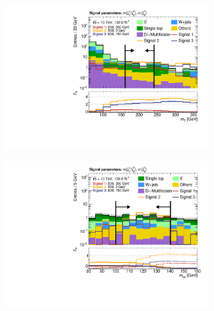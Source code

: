 \begin{figure}
\begin{subfigure}[b]{0.4\linewidth}
		\centering\includegraphics[width=\textwidth]{n1_SRMM_mct_bins/mt_both.pdf}
		\caption{\label{fig:Wh_reopt_second_round_n1_srmm_mt}}
	\end{subfigure}%
	\begin{subfigure}[b]{0.4\linewidth}
		\centering\includegraphics[width=\textwidth]{n1_SRMM_mct_bins/mbb_both.pdf}
		\caption{\label{fig:Wh_reopt_second_round_n1_srmm_mbb}}
	\end{subfigure}
	\begin{subfigure}[b]{0.4\linewidth}

\end{subfigure}
\end{figure}
